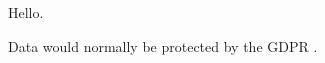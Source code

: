 \documentclass{article}
\begin{document}
  Hello\cite{greenwade93}.
  
  Data would normally be protected by the GDPR \cite{gdpr}.
  
  \printbibliography
\end{document}

